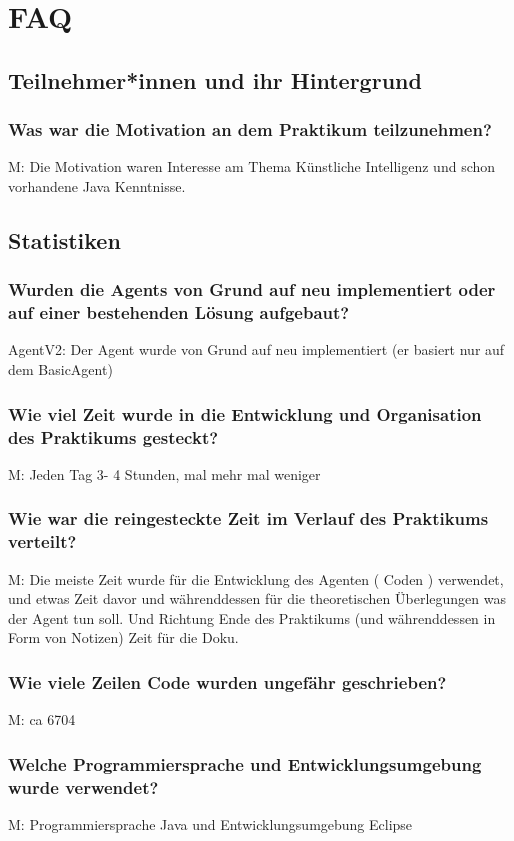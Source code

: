 \documentclass[runningheads]{llncs}
\begin{document}
\section{FAQ}
\subsection{Teilnehmer*innen und ihr Hintergrund}
\subsubsection{Was war die Motivation an dem Praktikum teilzunehmen?\\}
M: Die Motivation waren Interesse am Thema Künstliche Intelligenz und schon vorhandene Java Kenntnisse.
\subsection{Statistiken}
\subsubsection{Wurden die Agents von Grund auf neu implementiert oder auf einer bestehenden Lösung aufgebaut?\\}
AgentV2: Der Agent wurde von Grund auf neu implementiert (er basiert nur auf dem BasicAgent)
\subsubsection{Wie viel Zeit wurde in die Entwicklung und Organisation des Praktikums gesteckt?\\}
M: Jeden Tag 3- 4 Stunden, mal mehr mal weniger
\subsubsection{Wie war die reingesteckte Zeit im Verlauf des Praktikums verteilt?\\}
M: Die meiste Zeit wurde für die Entwicklung des Agenten ( Coden ) verwendet, und etwas Zeit davor und währenddessen für die theoretischen Überlegungen was der Agent tun soll. Und Richtung Ende des Praktikums (und währenddessen in Form von Notizen) Zeit für die Doku. 
\subsubsection{Wie viele Zeilen Code wurden ungefähr geschrieben?\\}
M: ca 6704
\subsubsection{Welche Programmiersprache und Entwicklungsumgebung wurde verwendet?\\}
M: Programmiersprache Java und Entwicklungsumgebung Eclipse
\end{document}
